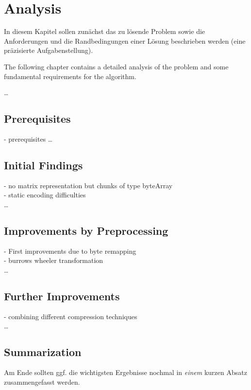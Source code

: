 
\chapter{Analysis}
\label{ch:Analysis}
In diesem Kapitel sollen zunächst das zu lösende Problem
sowie die Anforderungen und die Randbedingungen 
einer Lösung beschrieben werden (eine präzisierte Aufgabenstellung).

\par{
The following chapter contains a detailed analysis of the problem and some fundamental requirements for the algorithm. 
}

\ldots

\section{Prerequisites}
\label{ch:Analysis:sec:Prerequisites}
- prerequisites
\ldots

\section{Initial Findings}
\label{ch:Analysis:sec:Initial Findings}
- no matrix representation but chunks of type byteArray\\
- static encoding difficulties\\
\ldots

\section{Improvements by Preprocessing}
\label{ch:Analysis:sec:Improvements by Preprocessing}
- First improvements due to byte remapping\\
- burrows wheeler transformation\\
\ldots

\section{Further Improvements}
\label{ch:Analysis:sec:Further Improvements}
- combining different compression techniques\\
\ldots


\section{Summarization}
\label{ch:Analyse:sec:Summarization}

Am Ende sollten ggf. die wichtigsten Ergebnisse nochmal in \emph{einem}
kurzen Absatz zusammengefasst werden.

